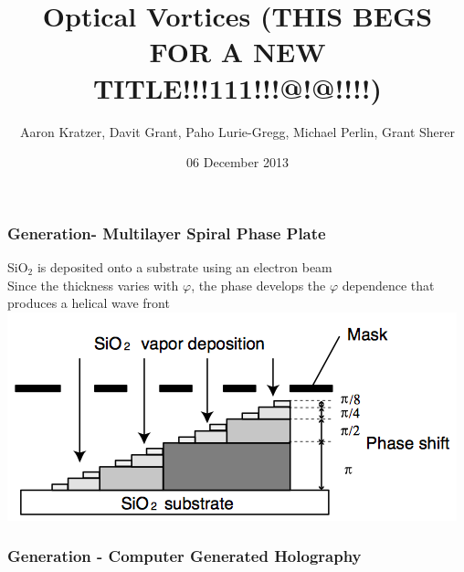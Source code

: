 \documentclass[xcolor=dvipsnames]{beamer}
\title{Optical Vortices (THIS BEGS FOR A NEW TITLE!!!111!!!@!@!!!!)}
\author{Aaron Kratzer, Davit Grant, Paho Lurie-Gregg,
  Michael Perlin, Grant Sherer}
\date{06 December 2013}
\renewcommand{\phi}{\varphi} %
\begin{document}
\begin{frame}
	\frametitle{Generation-  Multilayer Spiral Phase Plate}
	SiO$_2$ is deposited onto a substrate using an electron beam
	\\Since the thickness varies with $\phi$, the phase develops the $\phi$ dependence that produces a helical wave front
	\\\centering
	\includegraphics[scale=.3]{MSPP.jpg}
\end{frame}

\begin{frame}
	\frametitle{Generation - Computer Generated Holography}
	\centering
	
\end{frame}


\end{document}
